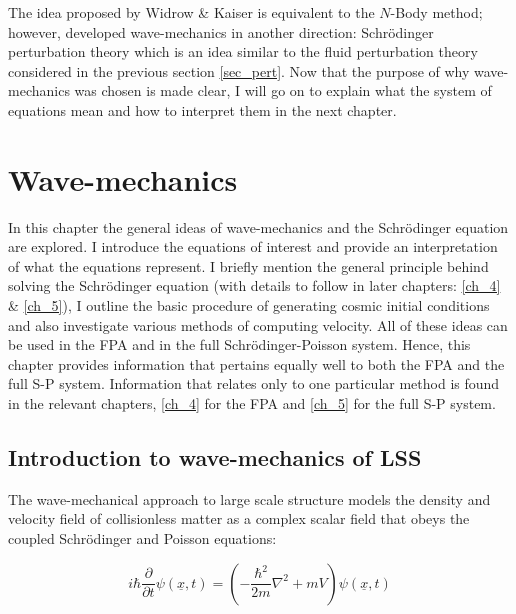 The idea proposed by Widrow \& Kaiser is equivalent to the $N$-Body method; however, \citet{bib_sk} developed wave-mechanics in another direction: Schr\"odinger perturbation theory which is an idea similar to the fluid perturbation theory considered in the previous section \ref{sec_pert}. Now that the purpose of why wave-mechanics was chosen is made clear, I will go on to explain what the system of equations mean and how to interpret them in the next chapter.

\chapter{Wave-mechanics}
\label{ch_3}
In this chapter the general ideas of wave-mechanics and the Schr\"odinger equation are explored. I introduce the equations of interest and provide an interpretation of what the equations represent. I briefly mention the general principle behind solving the Schr\"odinger equation (with details to follow in later chapters: \ref{ch_4} \& \ref{ch_5}), I outline the basic procedure of generating cosmic initial conditions and also investigate various methods of computing velocity. All of these ideas can be used in the FPA and in the full Schr\"odinger-Poisson system. Hence, this chapter provides information that pertains equally well to both the FPA and the full S-P system. Information that relates only to one particular method is found in the relevant chapters, \ref{ch_4} for the FPA and \ref{ch_5} for the full S-P system.

\section{Introduction to wave-mechanics of LSS}
%
%

The wave-mechanical approach to large scale structure models the density and velocity field of collisionless matter as a complex scalar field that obeys the coupled Schr\"odinger and Poisson equations:

\begin{equation}
\label{eqn_schroedinger}
 i\hbar\frac{\partial}{\partial t}\psi(\underline{x},t) = \left( -\frac{\hbar^2}{2m} \nabla^2 + mV \right) \psi(\underline{x},t)
\end{equation}

